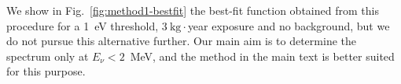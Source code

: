 \documentclass[a4paper,11pt]{article}
\renewcommand\({\left(}
\renewcommand\){\right)}
\renewcommand\[{\left[}
\renewcommand\]{\right]}
\theoremstyle{definition}
\newcommand{\kg}{\text{kg}}
\begin{document}
We show in Fig.~\ref{fig:method1-bestfit} the best-fit function obtained from this procedure for a 1~eV threshold, $3~\kg\cdot$year exposure and no background, but we do not pursue this alternative further. Our main aim is to determine the spectrum only at $E_\nu <2$~MeV, and the method in the main text is better suited for this purpose.

 



\end{document}
